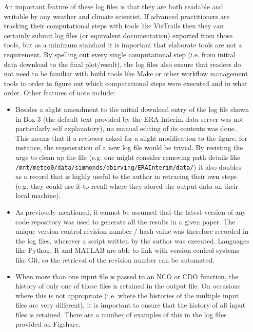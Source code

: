 An important feature of these log files is that they are both readable and writable by any weather and climate scientist. If advanced practitioners are tracking their computational steps with tools like VisTrails then they can certainly submit log files (or equivalent documentation) exported from those tools, but as a minimum standard it is important that elaborate tools are not a requirement. By spelling out every single computational step (i.e. from initial data download to the final plot/result), the log files also ensure that readers do not need to be familiar with build tools like Make or other workflow management tools in order to figure out which computational steps were executed and in what order. Other features of note include:
\begin{itemize}
\item Besides a slight amendment to the initial download entry of the log file shown in Box 3 (the default text provided by the ERA-Interim data server was not particularly self explanatory), no manual editing of its contents was done. This means that if a reviewer asked for a slight modification to the figure, for instance, the regeneration of a new log file would be trivial. By resisting the urge to clean up the file (e.g. one might consider removing path details like \verb|/mnt/meteo0/data/simmonds/dbirving/ERAInterim/data/|) it also doubles as a record that is highly useful to the author in retracing their own steps (e.g. they could use it to recall where they stored the output data on their local machine).
\item As previously mentioned, it cannot be assumed that the latest version of any code repository was used to generate all the results in a given paper. The unique version control revision number / hash value was therefore recorded in the log files, wherever a script written by the author was executed. Languages like Python, R and MATLAB are able to link with version control systems like Git, so the retrieval of the revision number can be automated.
\item When more than one input file is passed to an NCO or CDO function, the history of only one of those files is retained in the output file. On occasions where this is not appropriate (i.e. where the histories of the multiple input files are very different), it is important to ensure that the history of all input files is retained. There are a number of examples of this in the log files provided on Figshare. 
\end{itemize}
  
 
  
  
  
  
  
  
  
  
  
  
  
  
  
  
  
  
  
  
  
  
  
  
  
  
  
  
  
  